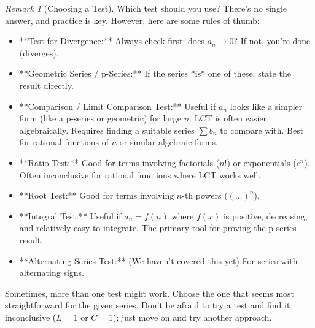 \documentclass[11pt]{article}
\theoremstyle{plain}
\theoremstyle{definition}
\theoremstyle{remark}
\newtheorem{remark}[theorem]{Remark}
\theoremstyle{adminstyle}
\begin{document}
\begin{remark}[Choosing a Test]
Which test should you use? There's no single answer, and practice is key. However, here are some rules of thumb:
\begin{itemize}
    \item **Test for Divergence:** Always check first: does $a_n \to 0$? If not, you're done (diverges).
    \item **Geometric Series / p-Series:** If the series *is* one of these, state the result directly.
    \item **Comparison / Limit Comparison Test:** Useful if $a_n$ looks like a simpler form (like a p-series or geometric) for large $n$. LCT is often easier algebraically. Requires finding a suitable series $\sum b_n$ to compare with. Best for rational functions of $n$ or similar algebraic forms.
    \item **Ratio Test:** Good for terms involving factorials ($n!$) or exponentials ($c^n$). Often inconclusive for rational functions where LCT works well.
    \item **Root Test:** Good for terms involving $n$-th powers ($( \dots )^n$).
    \item **Integral Test:** Useful if $a_n = f(n)$ where $f(x)$ is positive, decreasing, and relatively easy to integrate. The primary tool for proving the p-series result.
    \item **Alternating Series Test:** (We haven't covered this yet) For series with alternating signs.
\end{itemize}
Sometimes, more than one test might work. Choose the one that seems most straightforward for the given series. Don't be afraid to try a test and find it inconclusive ($L=1$ or $C=1$); just move on and try another approach.
\end{remark}
\end{document}
